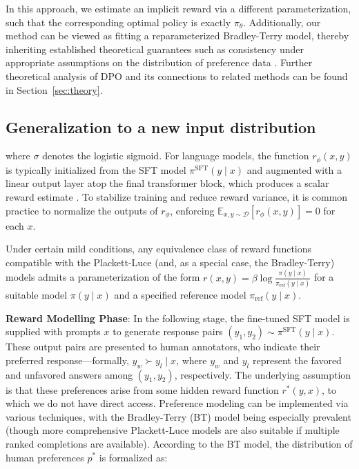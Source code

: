 In this approach, we estimate an implicit reward via a different parameterization, such that the corresponding optimal policy is exactly $\pi_\theta$. Additionally, our method can be viewed as fitting a reparameterized Bradley-Terry model, thereby inheriting established theoretical guarantees such as consistency under appropriate assumptions on the distribution of preference data \cite{bong2022generalized}. Further theoretical analysis of DPO and its connections to related methods can be found in Section~\ref{sec:theory}.

\subsection{Generalization to a new input distribution}

where $\sigma$ denotes the logistic sigmoid. For language models, the function $r_{\phi}(x, y)$ is typically initialized from the SFT model $\pi^\text{SFT}(y \mid x)$ and augmented with a linear output layer atop the final transformer block, which produces a scalar reward estimate \cite{ziegler2020finetuning}. To stabilize training and reduce reward variance, it is common practice to normalize the outputs of $r_\phi$, enforcing $\mathbb{E}_{x,y\sim \mathcal{D}}\left[r_\phi(x, y)\right] = 0$ for each $x$.

\begin{theorem}\label{thm:main}
    Under certain mild conditions, any equivalence class of reward functions compatible with the Plackett-Luce (and, as a special case, the Bradley-Terry) models admits a parameterization of the form ${r(x, y) = \beta \log \frac{\pi(y\mid x)}{\pi_\text{ref}(y\mid x)}}$ for a suitable model $\pi(y\mid x)$ and a specified reference model $\pi_\text{ref}(y \mid x)$.
\end{theorem}

\textbf{Reward Modelling Phase}: In the following stage, the fine-tuned SFT model is supplied with prompts $x$ to generate response pairs $(y_1, y_2)\sim \pi^\text{SFT}(y \mid x)$. These output pairs are presented to human annotators, who indicate their preferred response—formally, $y_w\succ y_l \mid x$, where $y_w$ and $y_l$ represent the favored and unfavored answers among $(y_1, y_2)$, respectively. The underlying assumption is that these preferences arise from some hidden reward function $r^*(y, x)$, to which we do not have direct access. Preference modeling can be implemented via various techniques, with the Bradley-Terry (BT) \cite{bradley1952rankanalysis} model being especially prevalent (though more comprehensive Plackett-Luce models \citep{plackett1975analysis, luce2012individual} are also suitable if multiple ranked completions are available). According to the BT model, the distribution of human preferences $p^*$ is formalized as:

